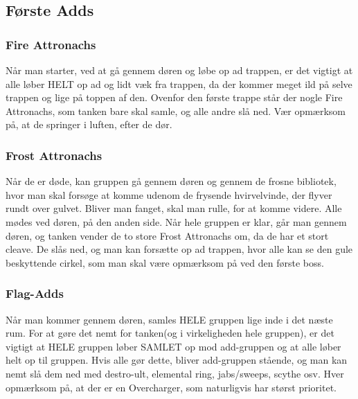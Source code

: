 \subsection*{Første Adds}
\subsubsection*{Fire Attronachs}
Når man starter, ved at gå gennem døren og løbe op ad trappen, er det vigtigt
at alle løber HELT op ad og lidt væk fra trappen, da der kommer meget ild på
selve trappen og lige på toppen af den. Ovenfor den første trappe står der
nogle Fire Attronachs, som tanken bare skal samle, og alle andre slå ned. Vær
opmærksom på, at de springer i luften, efter de dør.
\subsubsection*{Frost Attronachs}
Når de er døde, kan gruppen gå gennem døren og gennem de frosne bibliotek, hvor
man skal forsøge at komme udenom de frysende hvirvelvinde, der flyver rundt
over gulvet. Bliver man fanget, skal man rulle, for at komme videre. Alle mødes
ved døren, på den anden side. Når hele gruppen er klar, går man gennem døren,
og tanken vender de to store Frost Attronachs om, da de har et stort cleave. De
slås ned, og man kan forsætte op ad trappen, hvor alle kan se den gule
beskyttende cirkel, som man skal være opmærksom på ved den første boss.
\subsubsection*{Flag-Adds}
Når man kommer gennem døren, samles HELE gruppen lige inde i det næste rum. For
at gøre det nemt for tanken(og i virkeligheden hele gruppen), er det vigtigt at
HELE gruppen løber SAMLET op mod add-gruppen og at alle løber helt op til
gruppen. Hvis alle gør dette, bliver add-gruppen stående, og man kan nemt slå dem
ned med destro-ult, elemental ring, jabs/sweeps, scythe osv. Hver opmærksom på,
at der er en Overcharger, som naturligvis har størst prioritet.

